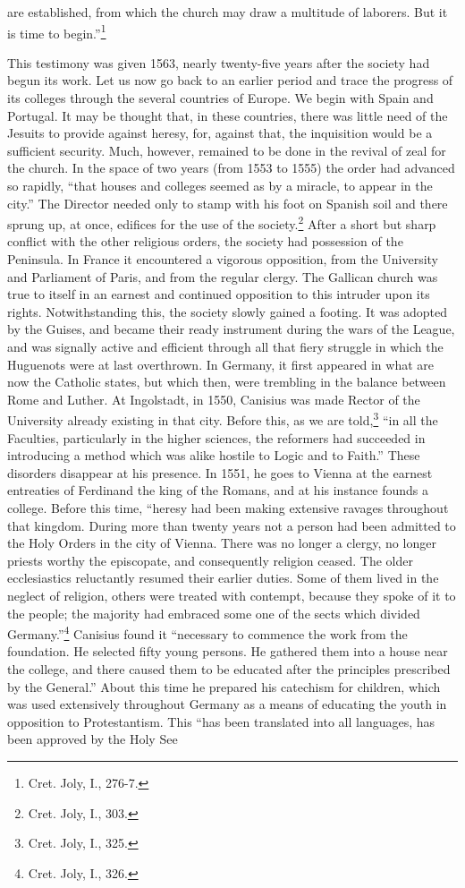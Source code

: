 \documentclass[]{book}
\let\rmarkdownfootnote\footnote%
\def\footnote{\protect\rmarkdownfootnote}
\begin{document}
are established, from which the church may draw a multitude of laborers. But it is time to begin.''\footnote{Cret. Joly, I., 276-7.}

This testimony was given 1563, nearly twenty-five years after the society had begun its work. Let us now go back to an earlier period and trace the progress of its colleges through the several countries of Europe. We begin with Spain and Portugal. It may be thought that, in these countries, there was little need of the Jesuits to provide against heresy, for, against that, the inquisition would be a sufficient security. Much, however, remained to be done in the revival of zeal for the church. In the space of two years (from 1553 to 1555) the order had advanced so rapidly, ``that houses and colleges seemed as by a miracle, to appear in the city.'' The Director needed only to stamp with his foot on Spanish soil and there sprung up, at once, edifices for the use of the society.\footnote{Cret. Joly, I., 303.} After a short but sharp conflict with the other religious orders, the society had possession of the Peninsula. In France it encountered a vigorous opposition, from the University and Parliament of Paris, and from the regular clergy. The Gallican church was true to itself in an earnest and continued opposition to this intruder upon its rights. Notwithstanding this, the society slowly gained a footing. It was adopted by the Guises, and became their ready instrument during the wars of the League, and was signally active and efficient through all that fiery struggle in which the Huguenots were at last overthrown. In Germany, it first appeared in what are now the Catholic states, but which then, were trembling in the balance between Rome and Luther. At Ingolstadt, in 1550, Canisius was made Rector of the University already existing in that city. Before this, as we are told,\footnote{Cret. Joly, I., 325.} ``in all the Faculties, particularly in the higher sciences, the reformers had succeeded in introducing a method which was alike hostile to Logic and to Faith.'' These disorders disappear at his presence. In 1551, he goes to Vienna at the earnest entreaties of Ferdinand the king of the Romans, and at his instance founds a college. Before this time, ``heresy had been making extensive ravages throughout that kingdom. During more than twenty years not a person had been admitted to the Holy Orders in the city of Vienna. There was no longer a clergy, no longer priests worthy the episcopate, and consequently religion ceased. The older ecclesiastics reluctantly resumed their earlier duties. Some of them lived in the neglect of religion, others were treated with contempt, because they spoke of it to the people; the majority had embraced some one of the sects which divided Germany.''\footnote{Cret. Joly, I., 326.} Canisius found it ``necessary to commence the work from the foundation. He selected fifty young persons. He gathered them into a house near the college, and there caused them to be educated after the principles prescribed by the General.'' About this time he prepared his catechism for children, which was used extensively throughout Germany as a means of educating the youth in opposition to Protestantism. This ``has been translated into all languages, has been approved by the Holy See 
\end{document}
